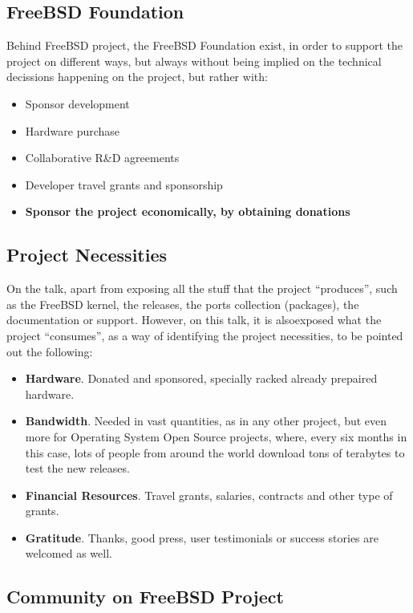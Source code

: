 \documentclass[11pt]{article}
\begin{document}
\subsection{FreeBSD Foundation}
Behind FreeBSD project, the FreeBSD Foundation exist, in order to support the project on different ways, but always without being implied on the technical decissions happening on the project, but rather with:
\begin{itemize}\itemsep0pt
\item{Sponsor development}
\item{Hardware purchase}
\item{Collaborative R\&D agreements}
\item{Developer travel grants and sponsorship}
\item{\textbf{Sponsor the project economically, by obtaining donations}}
\end{itemize}
\subsection{Project Necessities}
On the talk, apart from exposing all the stuff that the project ``produces'', such as the FreeBSD kernel, the releases, the ports collection (packages), the documentation or support. However, on this talk, it is alsoexposed what the project ``consumes'', as a way of identifying the project necessities, to be pointed out the following:
\begin{itemize}\itemsep0pt
\item{\textbf{Hardware}}. Donated and sponsored, specially racked already prepaired hardware.
\item{\textbf{Bandwidth}}. Needed in vast quantities, as in any other project, but even more for Operating System Open Source projects, where, every six months in this case, lots of people from around the world download tons of terabytes to test the new releases.
\item{\textbf{Financial Resources}}. Travel grants, salaries, contracts and other type of grants.
\item{\textbf{Gratitude}}. Thanks, good press, user testimonials or success stories are welcomed as well.
\end{itemize}
\subsection{Community on FreeBSD Project}
\end{document}
